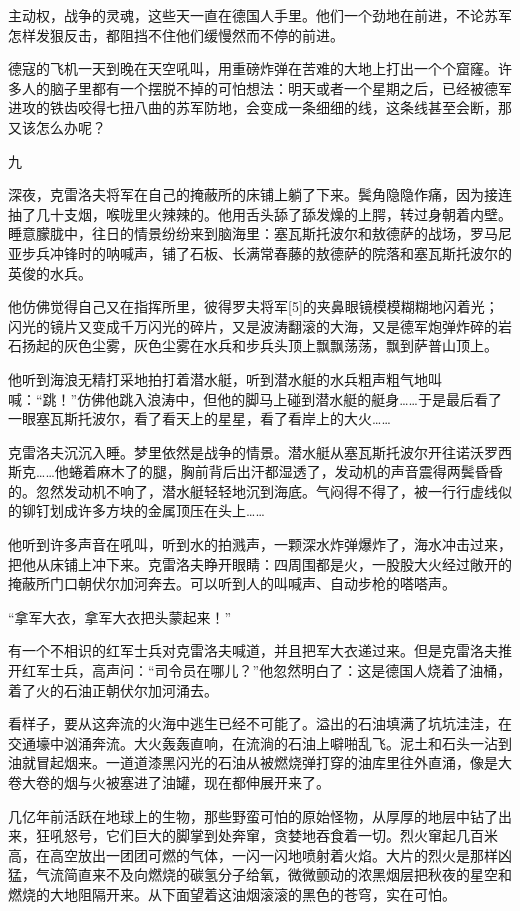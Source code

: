主动权，战争的灵魂，这些天一直在德国人手里。他们一个劲地在前进，不论苏军怎样发狠反击，都阻挡不住他们缓慢然而不停的前进。

德寇的飞机一天到晚在天空吼叫，用重磅炸弹在苦难的大地上打出一个个窟窿。许多人的脑子里都有一个摆脱不掉的可怕想法：明天或者一个星期之后，已经被德军进攻的铁齿咬得七扭八曲的苏军防地，会变成一条细细的线，这条线甚至会断，那又该怎么办呢？

九

深夜，克雷洛夫将军在自己的掩蔽所的床铺上躺了下来。鬓角隐隐作痛，因为接连抽了几十支烟，喉咙里火辣辣的。他用舌头舔了舔发燥的上腭，转过身朝着内壁。睡意朦胧中，往日的情景纷纷来到脑海里：塞瓦斯托波尔和敖德萨的战场，罗马尼亚步兵冲锋时的呐喊声，铺了石板、长满常春藤的敖德萨的院落和塞瓦斯托波尔的英俊的水兵。

他仿佛觉得自己又在指挥所里，彼得罗夫将军[5]的夹鼻眼镜模模糊糊地闪着光；闪光的镜片又变成千万闪光的碎片，又是波涛翻滚的大海，又是德军炮弹炸碎的岩石扬起的灰色尘雾，灰色尘雾在水兵和步兵头顶上飘飘荡荡，飘到萨普山顶上。

他听到海浪无精打采地拍打着潜水艇，听到潜水艇的水兵粗声粗气地叫喊：“跳！”仿佛他跳入浪涛中，但他的脚马上碰到潜水艇的艇身……于是最后看了一眼塞瓦斯托波尔，看了看天上的星星，看了看岸上的大火……

克雷洛夫沉沉入睡。梦里依然是战争的情景。潜水艇从塞瓦斯托波尔开往诺沃罗西斯克……他蜷着麻木了的腿，胸前背后出汗都湿透了，发动机的声音震得两鬓昏昏的。忽然发动机不响了，潜水艇轻轻地沉到海底。气闷得不得了，被一行行虚线似的铆钉划成许多方块的金属顶压在头上……

他听到许多声音在吼叫，听到水的拍溅声，一颗深水炸弹爆炸了，海水冲击过来，把他从床铺上冲下来。克雷洛夫睁开眼睛：四周围都是火，一股股大火经过敞开的掩蔽所门口朝伏尔加河奔去。可以听到人的叫喊声、自动步枪的嗒嗒声。

“拿军大衣，拿军大衣把头蒙起来！”

有一个不相识的红军士兵对克雷洛夫喊道，并且把军大衣递过来。但是克雷洛夫推开红军士兵，高声问：“司令员在哪儿？”他忽然明白了：这是德国人烧着了油桶，着了火的石油正朝伏尔加河涌去。

看样子，要从这奔流的火海中逃生已经不可能了。溢出的石油填满了坑坑洼洼，在交通壕中汹涌奔流。大火轰轰直响，在流淌的石油上噼啪乱飞。泥土和石头一沾到油就冒起烟来。一道道漆黑闪光的石油从被燃烧弹打穿的油库里往外直涌，像是大卷大卷的烟与火被塞进了油罐，现在都伸展开来了。

几亿年前活跃在地球上的生物，那些野蛮可怕的原始怪物，从厚厚的地层中钻了出来，狂吼怒号，它们巨大的脚掌到处奔窜，贪婪地吞食着一切。烈火窜起几百米高，在高空放出一团团可燃的气体，一闪一闪地喷射着火焰。大片的烈火是那样凶猛，气流简直来不及向燃烧的碳氢分子给氧，微微颤动的浓黑烟层把秋夜的星空和燃烧的大地阻隔开来。从下面望着这油烟滚滚的黑色的苍穹，实在可怕。


